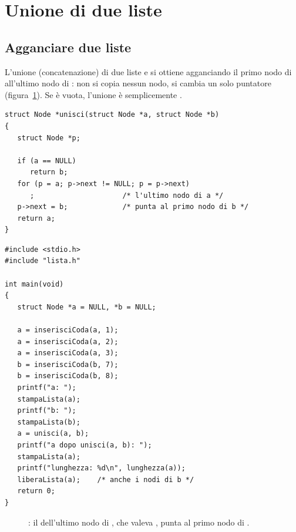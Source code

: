 \section{Unione di due liste}

\subsection{Agganciare due liste}

L'unione (concatenazione) di due liste  e  si ottiene
agganciando il primo nodo di  all'ultimo nodo di : non si
copia nessun nodo, si cambia un solo puntatore (figura~\ref{fig:unione}). Se
 è vuota, l'unione è semplicemente .

\begin{affianco}[0.55][c]
\begin{lstlisting}[style=c, name=lista.c]
struct Node *unisci(struct Node *a, struct Node *b)
{
   struct Node *p;

   if (a == NULL)
      return b;
   for (p = a; p->next != NULL; p = p->next)
      ;                     /* l'ultimo nodo di a */
   p->next = b;             /* punta al primo nodo di b */
   return a;
}
\end{lstlisting}
\risultato
\begin{lstlisting}[style=c, name=unione.c]
#include <stdio.h>
#include "lista.h"

int main(void)
{
   struct Node *a = NULL, *b = NULL;

   a = inserisciCoda(a, 1);
   a = inserisciCoda(a, 2);
   a = inserisciCoda(a, 3);
   b = inserisciCoda(b, 7);
   b = inserisciCoda(b, 8);
   printf("a: ");
   stampaLista(a);
   printf("b: ");
   stampaLista(b);
   a = unisci(a, b);
   printf("a dopo unisci(a, b): ");
   stampaLista(a);
   printf("lunghezza: %d\n", lunghezza(a));
   liberaLista(a);    /* anche i nodi di b */
   return 0;
}
\end{lstlisting}
\end{affianco}

\begin{figure}[H]
  \centering
  \caption{: il  dell'ultimo nodo di ,
           che valeva , punta al primo nodo di .}
  \label{fig:unione}
\end{figure}

